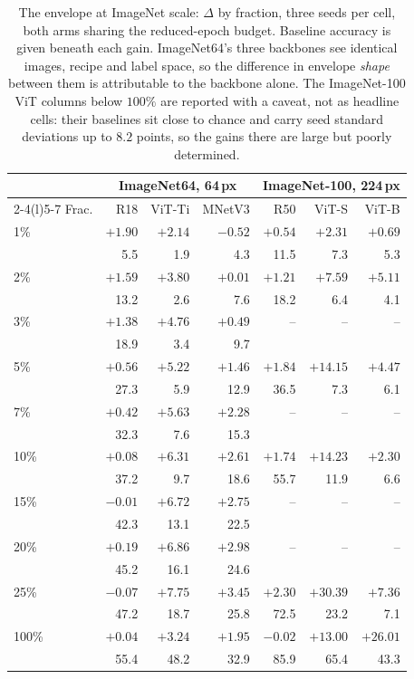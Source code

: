 \begin{table}[pos=htbp]
\caption{The envelope at ImageNet scale: $\Delta$ by fraction, three seeds
per cell, both arms sharing the reduced-epoch budget. Baseline accuracy is
given beneath each gain. ImageNet64's three backbones see identical images,
recipe and label space, so the difference in envelope \emph{shape} between
them is attributable to the backbone alone. The ImageNet-100 ViT columns
below $100\%$ are reported with a caveat, not as headline cells:
their baselines sit close to chance and carry seed standard deviations up to
$8.2$ points, so the gains there are large but poorly determined.}
\label{tab:inenv}
\centering\scriptsize
\setlength{\tabcolsep}{2.2pt}
\begin{tabular}{lrrrrrr}
\toprule
& \multicolumn{3}{c}{ImageNet64, 64\,px} & \multicolumn{3}{c}{ImageNet-100, 224\,px} \\
\cmidrule(r){2-4}\cmidrule(l){5-7}
Frac. & R18 & ViT-Ti & MNetV3 & R50 & ViT-S & ViT-B \\
\midrule
1\%   & $+1.90$ & $+2.14$ & $-0.52$ & $+0.54$ & $+2.31$  & $+0.69$ \\
      & \tiny 5.5 & \tiny 1.9 & \tiny 4.3 & \tiny 11.5 & \tiny 7.3 & \tiny 5.3 \\
2\%   & $+1.59$ & $+3.80$ & $+0.01$ & $+1.21$ & $+7.59$  & $+5.11$ \\
      & \tiny 13.2 & \tiny 2.6 & \tiny 7.6 & \tiny 18.2 & \tiny 6.4 & \tiny 4.1 \\
3\%   & $+1.38$ & $+4.76$ & $+0.49$ &--&--&-- \\
      & \tiny 18.9 & \tiny 3.4 & \tiny 9.7 &&& \\
5\%   & $+0.56$ & $+5.22$ & $+1.46$ & $+1.84$ & $+14.15$ & $+4.47$ \\
      & \tiny 27.3 & \tiny 5.9 & \tiny 12.9 & \tiny 36.5 & \tiny 7.3 & \tiny 6.1 \\
7\%   & $+0.42$ & $+5.63$ & $+2.28$ &--&--&-- \\
      & \tiny 32.3 & \tiny 7.6 & \tiny 15.3 &&& \\
10\%  & $+0.08$ & $+6.31$ & $+2.61$ & $+1.74$ & $+14.23$ & $+2.30$ \\
      & \tiny 37.2 & \tiny 9.7 & \tiny 18.6 & \tiny 55.7 & \tiny 11.9 & \tiny 6.6 \\
15\%  & $-0.01$ & $+6.72$ & $+2.75$ &--&--&-- \\
      & \tiny 42.3 & \tiny 13.1 & \tiny 22.5 &&& \\
20\%  & $+0.19$ & $+6.86$ & $+2.98$ &--&--&-- \\
      & \tiny 45.2 & \tiny 16.1 & \tiny 24.6 &&& \\
25\%  & $-0.07$ & $+7.75$ & $+3.45$ & $+2.30$ & $+30.39$ & $+7.36$ \\
      & \tiny 47.2 & \tiny 18.7 & \tiny 25.8 & \tiny 72.5 & \tiny 23.2 & \tiny 7.1 \\
100\% & $+0.04$ & $+3.24$ & $+1.95$ & $-0.02$ & $+13.00$ & $+26.01$ \\
      & \tiny 55.4 & \tiny 48.2 & \tiny 32.9 & \tiny 85.9 & \tiny 65.4 & \tiny 43.3 \\
\bottomrule
\end{tabular}
\end{table}

